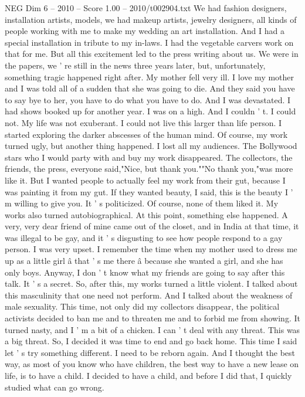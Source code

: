 \begin{textsample}{NEG Dim 6 – 2010 – Score 1.00 – 2010/t002904.txt}
We had fashion designers, installation artists, models, we had makeup artists, jewelry designers, all kinds of people working with me to make my wedding an art installation.
And I had a special installation in tribute to my in-laws.
I had the vegetable carvers work on that for me.
But all this excitement led to the press writing about us.
We were in the papers, we ' re still in the news three years later, but, unfortunately, something tragic happened right after.
My mother fell very ill.
I love my mother and I was told all of a sudden that she was going to die.
And they said you have to say bye to her, you have to do what you have to do.
And I was devastated.
I had shows booked up for another year.
I was on a high.
And I couldn ' t.
I could not.
My life was not exuberant.
I could not live this larger than life person.
I started exploring the darker abscesses of the human mind.
Of course, my work turned ugly, but another thing happened.
I lost all my audiences.
The Bollywood stars who I would party with and buy my work disappeared.
The collectors, the friends, the press, everyone said,"Nice, but thank you.""No thank you,"was more like it.
But I wanted people to actually feel my work from their gut, because I was painting it from my gut.
If they wanted beauty, I said, this is the beauty I ' m willing to give you.
It ' s politicized.
Of course, none of them liked it.
My works also turned autobiographical.
At this point, something else happened.
A very, very dear friend of mine came out of the closet, and in India at that time, it was illegal to be gay, and it ' s disgusting to see how people respond to a gay person.
I was very upset.
I remember the time when my mother used to dress me up as a little girl â that ' s me there â because she wanted a girl, and she has only boys.
Anyway, I don ' t know what my friends are going to say after this talk.
It ' s a secret.
So, after this, my works turned a little violent.
I talked about this masculinity that one need not perform.
And I talked about the weakness of male sexuality.
This time, not only did my collectors disappear, the political activists decided to ban me and to threaten me and to forbid me from showing.
It turned nasty, and I ' m a bit of a chicken.
I can ' t deal with any threat.
This was a big threat.
So, I decided it was time to end and go back home.
This time I said let ' s try something different.
I need to be reborn again.
And I thought the best way, as most of you know who have children, the best way to have a new lease on life, is to have a child.
I decided to have a child, and before I did that, I quickly studied what can go wrong.

\end{textsample}
